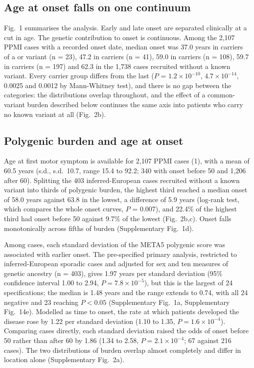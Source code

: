 \documentclass[10pt]{article}
\begin{document}
\subsection*{Age at onset falls on one continuum}

Fig.~1 summarises the analysis. Early and late onset are separated clinically at a cut in age. The genetic contribution to onset is continuous. Among the 2,107 PPMI cases with a
recorded onset date, median onset was 37.0 years in carriers of a  or 
variant (n = 23), 47.2 in  carriers (n = 41), 59.0 in  carriers (n = 108),
59.7 in  carriers (n = 197) and 62.3 in the 1,738 cases recruited without a known
variant. Every carrier group differs from the last ($P$ = $1.2\times10^{-10}$, $4.7\times10^{-14}$, 0.0025 and
0.0012 by Mann-Whitney test), and there is no gap between the categories: the distributions overlap
throughout, and the effect of a common-variant burden described below continues the same axis into
patients who carry no known variant at all (Fig.~2b).

\subsection*{Polygenic burden and age at onset}

Age at first motor symptom is available for 2,107 PPMI cases (1), with a mean of 60.5 years (s.d., s.d.\ 10.7,
range 15.4 to 92.2; 340 with onset before 50 and 1,206 after 60). Splitting the 403
inferred-European cases recruited without a known variant into thirds of polygenic burden, the
highest third reached a median onset of 58.0 years against 63.8 in the lowest, a difference of 5.9 years (log-rank test, which compares the whole onset curves, $P$ = 0.007), and 22.4\% of the highest third had onset before 50 against 9.7\% of
the lowest (Fig.~2b,c). Onset falls monotonically across fifths of burden (Supplementary Fig.~1d).

Among cases, each standard deviation of the META5 polygenic score was associated with earlier
onset. The pre-specified primary analysis, restricted to inferred-European sporadic cases and adjusted for sex and ten measures of genetic ancestry (n = 403), gives 1.97 years per standard deviation (95\%
confidence interval 1.00 to 2.94, $P = 7.8\times10^{-5}$), but this is the largest of 24
specifications; the median is 1.48 years and the range extends to 0.74, with all 24 negative and
23 reaching $P < 0.05$ (Supplementary Fig.~1a, Supplementary Fig.~14e). Modelled as time to onset, the rate at which patients developed the disease rose by 1.22 per standard deviation (1.10 to 1.35, $P = 1.6\times10^{-4}$). Comparing cases
directly, each standard deviation raised the odds of onset before 50 rather than after 60 by 1.86
(1.34 to 2.58, $P = 2.1\times10^{-4}$; 67 against 216 cases). The two distributions of burden
overlap almost completely and differ in location alone (Supplementary Fig.~2a).
\end{document}
